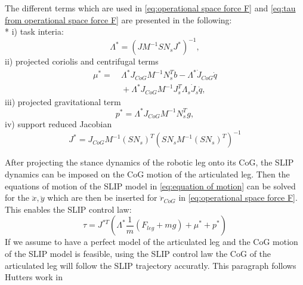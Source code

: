 \documentclass[journal,onecolumn]{IEEEtran}
\begin{document}
	The different terms which are used in \ref{eq:operational space force F} and \ref{eq:tau from operational space force F} are presented in the following:\\* 
	i) task interia: 
	\begin{equation}
	{\Lambda}^{*} = {(J {M}^{-1} S {N}_{s} {J}^{*})}^{-1}, 
	\end{equation}
	ii) projected coriolis and centrifugal terms
	\begin{equation}
	\begin{aligned}
	{\mu}^{*} = & \ {\Lambda}^{*} {J}_{CoG} {M}^{-1} {N}_{s}^{T} b - {\Lambda}^{*} {\dot{J}}_{CoG} \dot{q} \\
	& \ + {\Lambda}^{*} {J}_{CoG} {M}^{-1} {J}_{s}^{T} {\Lambda}_{s} {\dot{J}}_{s} \dot{q},\
	\end{aligned}
	\end{equation}
	iii) projected gravitational term
	\begin{equation}
	{p}^{*} = {\Lambda}^{*} {J}_{CoG} {M}^{-1} {N}_{s}^{T} g,
	\end{equation}
	iv) support reduced Jacobian
	\begin{equation}
	{J}^{*} = {J}_{CoG} {M}^{-1} {(S {N}_{s})}^{T} {(S {N}_{s} {M}^{-1} {(S {N}_{s})}^{T})}^{-1}
	\end{equation}
	
	After projecting the stance dynamics of the robotic leg onto its CoG, the SLIP dynamics can be imposed on the CoG motion of the articulated leg. 
	Then the equations of motion of the SLIP model 
	in \ref{eq:equation of motion} can be solved for the \(\ddot{x}, \ddot{y}\) which are then be inserted for \({\ddot{r}}_{CoG}\) in \ref{eq:operational space force F}. This 
	enables the SLIP control law:
	\begin{equation}
	\tau = {J}^{*T} ({\Lambda}^{*} \frac{1}{m} ({F}_{leg} + mg) + {\mu}^{*} + {p}^{*})
	\end{equation}
	If we assume to have a perfect model of the articulated leg and the CoG motion of the SLIP model is feasible, using the SLIP control law the CoG of the articulated leg will 
	follow the SLIP trajectory accuratly. This paragraph follows Hutters work in \cite{Hutter2010}
	
	
\end{document}
